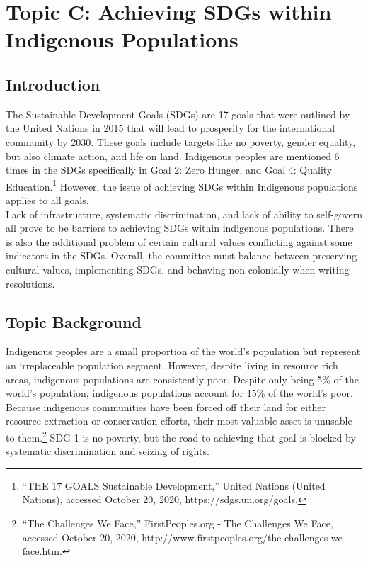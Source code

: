 \documentclass[10pt, letterpaper]{article}
\begin{document}
\newpage
\section{{Topic C: Achieving SDGs within Indigenous
Populations}}

\subsection{Introduction}

The Sustainable Development Goals (SDGs) are 17 goals that were outlined
by the United Nations in 2015 that will lead to prosperity for the
international community by 2030. These goals include targets like no
poverty, gender equality, but also climate action, and life on land.
Indigenous peoples are mentioned 6 times in the SDGs specifically in
Goal 2: Zero Hunger, and Goal 4: Quality Education.\footnote{``THE 17
  GOALS \textbar{} Sustainable Development,'' United Nations (United
  Nations), accessed October 20, 2020, https://sdgs.un.org/goals.}
However, the issue of achieving SDGs within Indigenous populations
applies to all goals. \\

Lack of infrastructure, systematic discrimination, and lack of ability
to self-govern all prove to be barriers to achieving SDGs within
indigenous populations. There is also the additional problem of certain
cultural values conflicting against some indicators in the SDGs.
Overall, the committee must balance between preserving cultural values,
implementing SDGs, and behaving non-colonially when writing resolutions. \\

\subsection{Topic Background}

Indigenous peoples are a small proportion of the world's population but
represent an irreplaceable population segment. However, despite living
in resource rich areas, indigenous populations are consistently poor.
Despite only being 5\% of the world's population, indigenous populations
account for 15\% of the world's poor. Because indigenous communities
have been forced off their land for either resource extraction or
conservation efforts, their most valuable asset is unusable to
them.\footnote{``The Challenges We Face,'' FirstPeoples.org - The
  Challenges We Face, accessed October 20, 2020,
  http://www.firstpeoples.org/the-challenges-we-face.htm.} SDG 1 is no
poverty, but the road to achieving that goal is blocked by systematic
discrimination and seizing of rights. \\
\end{document}
